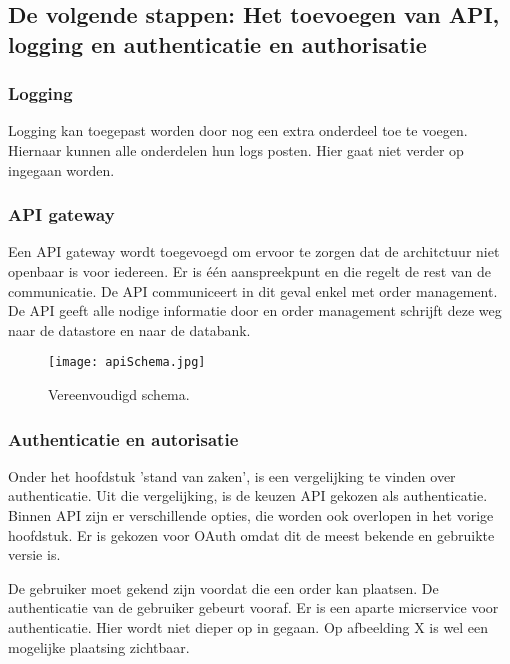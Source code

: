 \subsection{De volgende stappen: Het toevoegen van API, logging en authenticatie en authorisatie}
\subsubsection{Logging}
Logging kan toegepast worden door nog een extra onderdeel toe te voegen. Hiernaar kunnen alle onderdelen hun logs posten. Hier gaat niet verder op ingegaan worden. 

\subsubsection{API gateway}
Een API gateway wordt toegevoegd om ervoor te zorgen dat de architctuur niet openbaar is voor iedereen. Er is één aanspreekpunt en die regelt de rest van de communicatie.
De API communiceert in dit geval enkel met order management. De API geeft alle nodige informatie door en order management schrijft deze weg naar de datastore en naar de databank.
\begin{figure}[h]
	\texttt{[image: apiSchema.jpg]}
	\caption{Vereenvoudigd schema.}
	\centering
\end{figure}

\subsubsection{Authenticatie en autorisatie}
Onder het hoofdstuk 'stand van zaken', is een vergelijking te vinden over authenticatie. Uit die vergelijking, is de keuzen API gekozen als authenticatie. Binnen API zijn er verschillende opties, die worden ook overlopen in het vorige hoofdstuk. Er is gekozen voor OAuth omdat dit de meest bekende en gebruikte versie is.

De gebruiker moet gekend zijn voordat die een order kan plaatsen. De authenticatie van de gebruiker gebeurt vooraf. Er is een aparte micrservice voor authenticatie. Hier wordt niet dieper op in gegaan.
Op afbeelding X is wel een mogelijke plaatsing zichtbaar.


